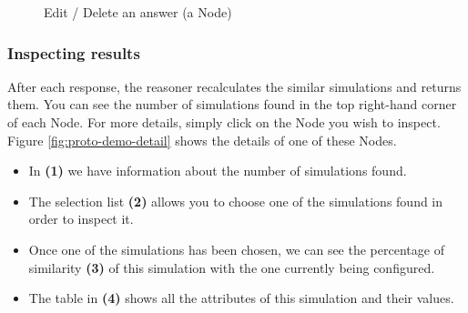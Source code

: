     \begin{figure}[h]
    \centering
    \caption{\label{fig:proto-demo-edit-delete-answer}  Edit / Delete an answer (a Node)}
    \end{figure}

    
    \subsubsection{Inspecting results}
    After each response, the reasoner recalculates the similar simulations and returns them. You can see the number of simulations found in the top right-hand corner of each Node. For more details, simply click on the Node you wish to inspect. Figure \ref{fig:proto-demo-detail} shows the details of one of these Nodes.
    
    \begin{itemize}
        \item In \textbf{(1)} we have information about the number of simulations found.
        \item The selection list \textbf{(2)} allows you to choose one of the simulations found in order to inspect it.
        \item Once one of the simulations has been chosen, we can see the percentage of similarity \textbf{(3)} of this simulation with the one currently being configured.
        \item The table in \textbf{(4)} shows all the attributes of this simulation and their values.
    \end{itemize}
    
